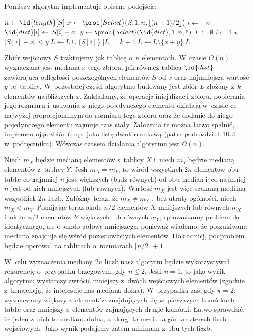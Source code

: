 Poniższy algorytm implementuje opisane podejście:
\begin{codebox}
\li	$n\gets\id{length}[S]$
\li	$x\gets\proc{Select}(S,1,n,\lfloor(n+1)/2\rfloor)$
\li	\For $i\gets1$ \To $n$
\li		\Do $\id{dist}[i]\gets|S[i]-x|$
		\End
\li	$y\gets\proc{Select}(\id{dist},1,n,k)$
\li	$L\gets\emptyset$
\li	\For $i\gets1$ \To $n$
\li		\Do
			\If $|S[i]-x|\le y$
\li				\Then $L\gets L\cup\{S[i]\}$
				\End
		\End
\li	\If $|L|=k+1$
\li		\Then $L\gets L\setminus\{x+y\}$
		\End
\li	\Return $L$
\end{codebox}
Zbiór wejściowy $S$ traktujemy jak tablicę o~$n$ elementach. W~czasie $O(n)$ wyznaczana jest mediana $x$ tego zbioru, jak również tablica $\id{dist}$ zawierająca odległości poszczególnych elementów $S$ od $x$ oraz  najmniejsza wartość $y$ tej tablicy. W~pozostałej części algorytmu budowany jest zbiór $L$ złożony z~$k$ elementów najbliższych $x$. Zakładamy, że operacje inicjalizacji zbioru, pobierania jego rozmiaru i~usuwania z~niego pojedynczego elementu działają w~czasie co najwyżej proporcjonalnym do rozmiaru tego zbioru oraz że dodanie do niego pojedynczego elementu zajmuje czas stały. Założenia te można łatwo spełnić, implementując zbiór $L$ np.\ jako listę dwukierunkową (patrz podrozdział~10.2 w~podręczniku). Wówczas czasem działania algorytmu jest $O(n)$.

\exercise %
Niech $m_X$ będzie medianą elementów z~tablicy $X$ i~niech $m_Y$ będzie medianą elementów z~tablicy $Y$. Jeśli $m_X=m_Y$, to wśród wszystkich $2n$ elementów obu tablic co najmniej $n$ jest większych (bądź równych) od obu median i~co najmniej $n$ jest od nich mniejszych (lub równych). Wartość $m_X$ jest więc szukaną medianą wszystkich $2n$ liczb. Załóżmy teraz, że $m_X\ne m_Y$ i~bez utraty ogólności, niech $m_X<m_Y$. Pomijając teraz około $n/2$ elementów $X$ mniejszych lub równych $m_X$ i~około $n/2$ elementów $Y$ większych lub równych $m_Y$, sprowadzamy problem do identycznego, ale o~około połowę mniejszego, ponieważ wiadomo, że poszukiwana mediana znajduje się wśród pozostawionych elementów. Dokładniej, podproblem będzie operował na tablicach o~rozmiarach $\lfloor n/2\rfloor+1$.

W~celu wyznaczenia mediany $2n$ liczb nasz algorytm będzie wykorzystywał rekurencję o~przypadku brzegowym, gdy $n\le2$. Jeśli $n=1$, to jako wynik algorytmu wystarczy zwrócić mniejszy z~dwóch wejściowych elementów (zgodnie z~konwencją, że interesuje nas mediana dolna). W~przypadku zaś, gdy $n=2$, wyznaczamy większy z~elementów znajdujących się w~pierwszych komórkach tablic oraz mniejszy z~elementów zajmujących drugie komórki. Łatwo sprawdzić, że jeden z~nich to mediana dolna, a~drugi to mediana górna czterech liczb wejściowych. Jako wynik podajemy zatem minimum z~obu tych liczb.

